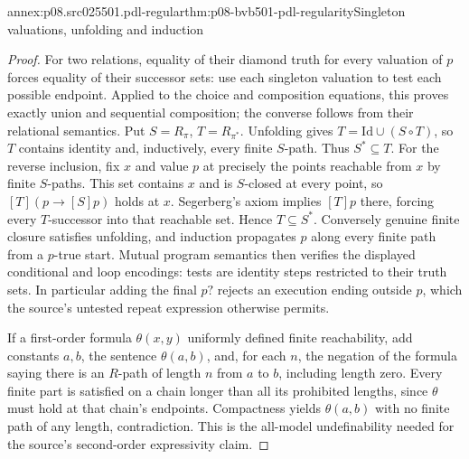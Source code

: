 \begin{annexitem}{annex:p08.src025501.pdl-regular}{thm:p08-bvb501-pdl-regularity}{Singleton valuations, unfolding and induction}
\begin{proof}
For two relations, equality of their diamond truth for every valuation
of \(p\) forces equality of their successor sets: use each singleton
valuation to test each possible endpoint. Applied to the choice and
composition equations, this proves exactly union and sequential
composition; the converse follows from their relational semantics.
Put \(S=R_\pi\), \(T=R_{\pi^*}\). Unfolding gives
\(T=\mathrm{Id}\cup(S\circ T)\), so \(T\) contains identity
and, inductively, every finite \(S\)-path. Thus \(S^*\subseteq T\).
For the reverse inclusion, fix \(x\) and value \(p\) at precisely
the points reachable from \(x\) by finite \(S\)-paths. This set
contains \(x\) and is \(S\)-closed at every point, so
\([T](p\to[S]p)\) holds at \(x\). Segerberg's axiom implies
\([T]p\) there, forcing every \(T\)-successor into that reachable
set. Hence \(T\subseteq S^*\). Conversely genuine finite closure
satisfies unfolding, and induction propagates \(p\) along every
finite path from a \(p\)-true start. Mutual program semantics then
verifies the displayed conditional and loop encodings: tests are
identity steps restricted to their truth sets. In particular adding
the final \(p?\) rejects an execution ending outside \(p\),
which the source's untested repeat expression otherwise permits.

If a first-order formula \(\theta(x,y)\) uniformly defined finite
reachability, add constants \(a,b\), the sentence \(\theta(a,b)\),
and, for each \(n\), the negation of the formula saying there is
an \(R\)-path of length \(n\) from \(a\) to \(b\), including
length zero. Every finite part is satisfied on a chain longer than
all its prohibited lengths, since \(\theta\) must hold at that
chain's endpoints. Compactness yields \(\theta(a,b)\) with no
finite path of any length, contradiction. This is the all-model
undefinability needed for the source's second-order expressivity claim.
\end{proof}
\end{annexitem}

